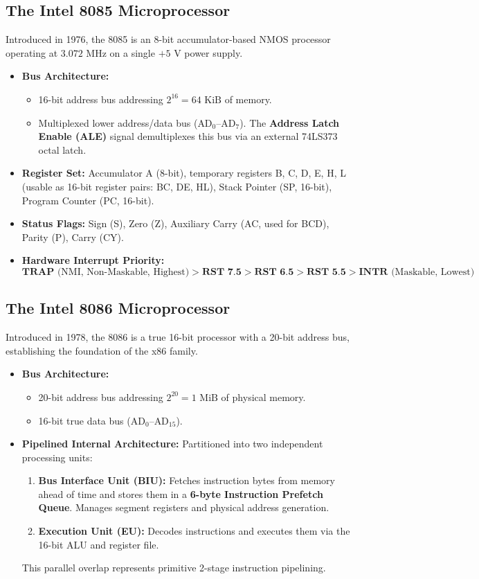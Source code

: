 \subsection{The Intel 8085 Microprocessor}
Introduced in 1976, the 8085 is an 8-bit accumulator-based NMOS processor operating at $3.072\text{ MHz}$ on a single $+5\text{ V}$ power supply.
\begin{itemize}
    \item \textbf{Bus Architecture:}
    \begin{itemize}
        \item 16-bit address bus addressing $2^{16} = 64\text{ KiB}$ of memory.
        \item Multiplexed lower address/data bus ($\text{AD}_0$--$\text{AD}_7$). The \textbf{Address Latch Enable (ALE)} signal demultiplexes this bus via an external 74LS373 octal latch.
    \end{itemize}
    \item \textbf{Register Set:} Accumulator A (8-bit), temporary registers B, C, D, E, H, L (usable as 16-bit register pairs: BC, DE, HL), Stack Pointer (SP, 16-bit), Program Counter (PC, 16-bit).
    \item \textbf{Status Flags:} Sign (S), Zero (Z), Auxiliary Carry (AC, used for BCD), Parity (P), Carry (CY).
    \item \textbf{Hardware Interrupt Priority:}
    \[ \textbf{TRAP} \text{ (NMI, Non-Maskable, Highest)} > \textbf{RST 7.5} > \textbf{RST 6.5} > \textbf{RST 5.5} > \textbf{INTR} \text{ (Maskable, Lowest)} \]
\end{itemize}

\subsection{The Intel 8086 Microprocessor}
Introduced in 1978, the 8086 is a true 16-bit processor with a 20-bit address bus, establishing the foundation of the x86 family.
\begin{itemize}
    \item \textbf{Bus Architecture:}
    \begin{itemize}
        \item 20-bit address bus addressing $2^{20} = 1\text{ MiB}$ of physical memory.
        \item 16-bit true data bus ($\text{AD}_0$--$\text{AD}_{15}$).
    \end{itemize}
    \item \textbf{Pipelined Internal Architecture:} Partitioned into two independent processing units:
    \begin{enumerate}[label=\bfseries\arabic*.]
        \item \textbf{Bus Interface Unit (BIU):} Fetches instruction bytes from memory ahead of time and stores them in a \textbf{6-byte Instruction Prefetch Queue}. Manages segment registers and physical address generation.
        \item \textbf{Execution Unit (EU):} Decodes instructions and executes them via the 16-bit ALU and register file.
    \end{enumerate}
    This parallel overlap represents primitive 2-stage instruction pipelining.
\end{itemize}

